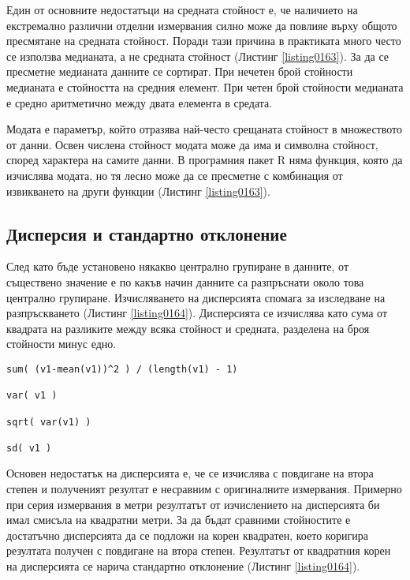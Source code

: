 Един от основните недостатъци на средната стойност е, че  наличието на екстремално различни отделни измервания силно може да повлияе върху общото пресмятане на средната стойност. Поради тази причина в практиката много често се използва медианата, а не средната стойност (Листинг \ref{listing0163}). За да се пресметне медианата данните се сортират. При нечетен брой стойности медианата е стойността на средния елемент. При четен брой стойности медианата е средно аритметично между двата елемента в средата. 

Модата е параметър, който отразява най-често срещаната стойност в множеството от данни. Освен числена стойност модата може да има и символна стойност, според характера на самите данни. В програмния пакет R няма функция, която да изчислява модата, но тя лесно може да се пресметне с комбинация от извикването на други функции (Листинг \ref{listing0163}).

\subsection{Дисперсия и стандартно отклонение}

След като бъде установено някакво централно групиране в данните, от съществено значение е по какъв начин данните са разпръснати около това централно групиране. Изчисляването на дисперсията спомага за изследване на разпръскването (Листинг \ref{listing0164}). Дисперсията се изчислява като сума от квадрата на разликите между всяка стойност и средната, разделена на броя стойности минус едно. 

\begin{lstlisting}[caption=Дисперсия и стандартно отклонение, label=listing0164]
sum( (v1-mean(v1))^2 ) / (length(v1) - 1)

var( v1 )

sqrt( var(v1) )

sd( v1 )
\end{lstlisting}

Основен недостатък на дисперсията е, че се изчислява с повдигане на втора степен и полученият резултат е несравним с оригиналните измервания. Примерно при серия измервания в метри резултатът от изчислението на дисперсията би имал смисъла на квадратни метри. За да бъдат сравними стойностите е достатъчно дисперсията да се подложи на корен квадратен, което коригира резултата получен с повдигане на втора степен. Резултатът от квадратния корен на дисперсията се нарича стандартно отклонение (Листинг \ref{listing0164}).

